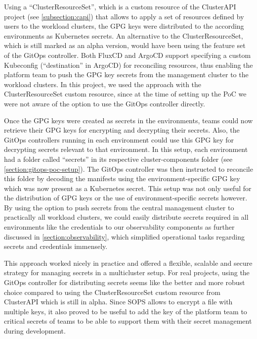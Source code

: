             Using a ``ClusterResourceSet'', which is a custom resource of the ClusterAPI project (see \autoref{subsection:capi}) that allows to apply a set of resources defined by users to the workload clusters, the GPG keys were distributed to the according environments as Kubernetes secrets. An alternative to the ClusterResourceSet, which is still marked as an alpha version, would have been using the feature set of the GitOps controller. Both FluxCD and ArgoCD support specifying a custom Kubeconfig (``destination'' in ArgoCD) for reconciling resources, thus enabling the platform team to push the GPG key secrets from the management cluster to the workload clusters. In this project, we used the approach with the ClusterResourceSet custom resource, since at the time of setting up the PoC we were not aware of the option to use the GitOps controller directly. 
            
            Once the GPG keys were created as secrets in the environments, teams could now retrieve their GPG keys for encrypting and decrypting their secrets. Also, the GitOps controllers running in each environment could use this GPG key for decrypting secrets relevant to that environment. In this setup, each environment had a folder called ``secrets'' in its respective cluster-components folder (see \autoref{section:gitops-poc-setup}). The GitOps controller was then instructed to reconcile this folder by decoding the manifests using the environment-specific GPG key which was now present as a Kubernetes secret. This setup was not only useful for the distribution of GPG keys or the use of environment-specific secrets however. By using the option to push secrets from the central management cluster to practically all workload clusters, we could easily distribute secrets required in all environments like the credentials to our observability components as further discussed in \autoref{section:observability}, which simplified operational tasks regarding secrets and credentials immensely.\newline

            This approach worked nicely in practice and offered a flexible, scalable and secure strategy for managing secrets in a multicluster setup. For real projects, using the GitOps controller for distributing secrets seems like the better and more robust choice compared to using the ClusterResourceSet custom resource from ClusterAPI which is still in alpha. Since SOPS allows to encrypt a file with multiple keys, it also proved to be useful to add the key of the platform team to critical secrets of teams to be able to support them with their secret management during development.
    


